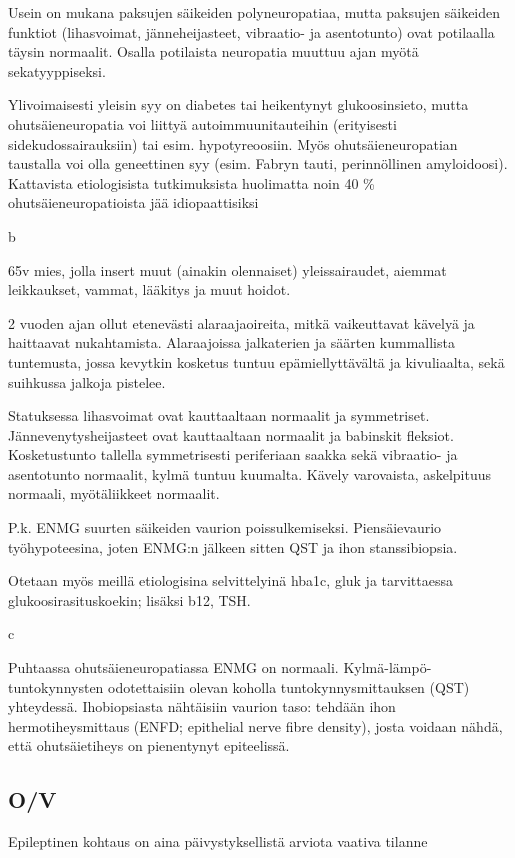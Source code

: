 \documentclass[
]{book}
\begin{document}
Usein on mukana paksujen säikeiden polyneuropatiaa, mutta paksujen säikeiden funktiot (lihasvoimat, jänneheijasteet, vibraatio- ja asentotunto) ovat potilaalla täysin normaalit. Osalla potilaista neuropatia muuttuu ajan myötä sekatyyppiseksi.

Ylivoimaisesti yleisin syy on diabetes tai heikentynyt glukoosinsieto, mutta ohutsäieneuropatia voi liittyä autoimmuunitauteihin (erityisesti sidekudossairauksiin) tai esim. hypotyreoosiin. Myös ohutsäieneuropatian taustalla voi olla geneettinen syy (esim. Fabryn tauti, perinnöllinen amyloidoosi). Kattavista etiologisista tutkimuksista huolimatta noin 40 \% ohutsäieneuropatioista jää idiopaattisiksi

b

65v mies, jolla insert muut (ainakin olennaiset) yleissairaudet, aiemmat leikkaukset, vammat, lääkitys ja muut hoidot.

2 vuoden ajan ollut etenevästi alaraajaoireita, mitkä vaikeuttavat kävelyä ja haittaavat nukahtamista. Alaraajoissa jalkaterien ja säärten kummallista tuntemusta, jossa kevytkin kosketus tuntuu epämiellyttävältä ja kivuliaalta, sekä suihkussa jalkoja pistelee.

Statuksessa lihasvoimat ovat kauttaaltaan normaalit ja symmetriset. Jännevenytysheijasteet ovat kauttaaltaan normaalit ja babinskit fleksiot. Kosketustunto tallella symmetrisesti periferiaan saakka sekä vibraatio- ja asentotunto normaalit, kylmä tuntuu kuumalta. Kävely varovaista, askelpituus normaali, myötäliikkeet normaalit.

P.k. ENMG suurten säikeiden vaurion poissulkemiseksi. Piensäievaurio työhypoteesina, joten ENMG:n jälkeen sitten QST ja ihon stanssibiopsia.

Otetaan myös meillä etiologisina selvittelyinä hba1c, gluk ja tarvittaessa glukoosirasituskoekin; lisäksi b12, TSH.

c

Puhtaassa ohutsäieneuropatiassa ENMG on normaali. Kylmä-lämpö-tuntokynnysten odotettaisiin olevan koholla tuntokynnysmittauksen (QST) yhteydessä. Ihobiopsiasta nähtäisiin vaurion taso: tehdään ihon hermotiheysmittaus (ENFD; epithelial nerve fibre density), josta voidaan nähdä, että ohutsäietiheys on pienentynyt epiteelissä.

\subsection{O/V}\label{ov-5}

Epileptinen kohtaus on aina päivystyksellistä arviota vaativa tilanne
\end{document}
